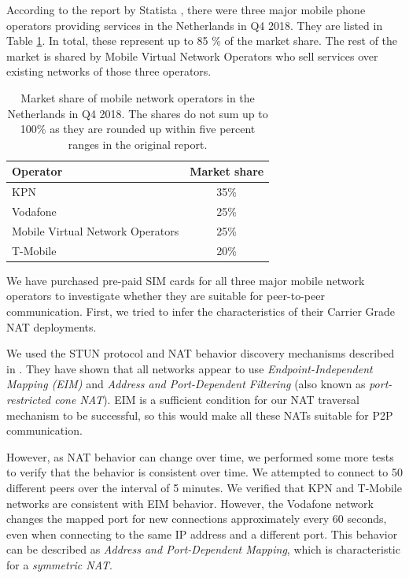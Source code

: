 According to the report by Statista \cite{statista:marketshare}, there were three major mobile phone operators providing services in the Netherlands in Q4 2018. They are listed in Table \ref{table_marketshare}. In total, these represent up to 85 \% of the market share. The rest of the market is shared by Mobile Virtual Network Operators who sell services over existing networks of those three operators.

\begin{table}[h!]
    \centering
    \begin{tabular}{ | l | c | }
        \hline
        \textbf{Operator} & \textbf{Market share} \\
        \hline
        KPN & 35\% \\
        Vodafone & 25\% \\
        Mobile Virtual Network Operators & 25\% \\
        T-Mobile & 20\% \\
        \hline
    \end{tabular}
    \caption{Market share of mobile network operators in the Netherlands in Q4 2018. The shares do not sum up to 100\% as they are rounded up within five percent ranges in the original report. \cite{statista:marketshare}}
    \label{table_marketshare}
\end{table}

We have purchased pre-paid SIM cards for all three major mobile network operators to investigate whether they are suitable for peer-to-peer communication. First, we tried to infer the characteristics of their Carrier Grade NAT deployments.

We used the STUN protocol and NAT behavior discovery mechanisms described in \cite{rfc5780}. They have shown that all networks appear to use \textit{Endpoint-Independent Mapping (EIM)} and \textit{Address and Port-Dependent Filtering} (also known as \textit{port-restricted cone NAT}). EIM is a sufficient condition for our NAT traversal mechanism to be successful, so this would make all these NATs suitable for P2P communication.

However, as NAT behavior can change over time, we performed some more tests to verify that the behavior is consistent over time. We attempted to connect to 50 different peers over the interval of 5 minutes. We verified that KPN and T-Mobile networks are consistent with EIM behavior. However, the Vodafone network changes the mapped port for new connections approximately every 60 seconds, even when connecting to the same IP address and a different port. This behavior can be described as \textit{Address and Port-Dependent Mapping}, which is characteristic for a \textit{symmetric NAT}.

